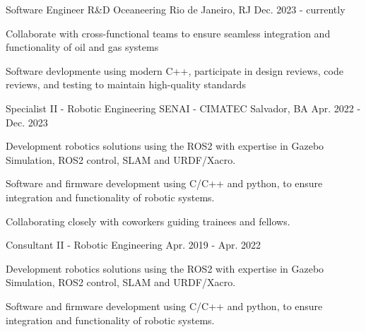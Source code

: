 

\begin{cventries}

\cventry
  {Software Engineer R\&D} %
  {Oceaneering} %
  {Rio de Janeiro, RJ} %
  {Dec. 2023 - currently} %
  {
    \begin{cvitems} %
      \item {Collaborate with cross-functional teams to ensure seamless integration and functionality of oil and gas systems}
      \item {Software devlopmente using modern C++, participate in design reviews, code reviews, and testing to maintain high-quality standards}
    \end{cvitems}
  }

\cventry
  {Specialist II - Robotic Engineering} %
  {SENAI - CIMATEC} %
  {Salvador, BA} %
  {Apr. 2022 - Dec. 2023} %
  {
    \begin{cvitems} %
      \item {Development robotics solutions using the ROS2 with expertise in Gazebo Simulation, ROS2 control, SLAM and URDF/Xacro.}
      \item {Software and firmware development using C/C++ and python, to ensure integration and functionality of robotic systems.}
      \item {Collaborating closely with coworkers guiding trainees and fellows.}
    \end{cvitems}
  }

\cventry
  {Consultant II - Robotic Engineering} %
  {} %
  {} %
  {Apr. 2019 - Apr. 2022} %
  {
    \begin{cvitems} %
      \item {Development robotics solutions using the ROS2 with expertise in Gazebo Simulation, ROS2 control, SLAM and URDF/Xacro.}
      \item {Software and firmware development using C/C++ and python, to ensure integration and functionality of robotic systems.}
    \end{cvitems}
  }


\end{cventries}

